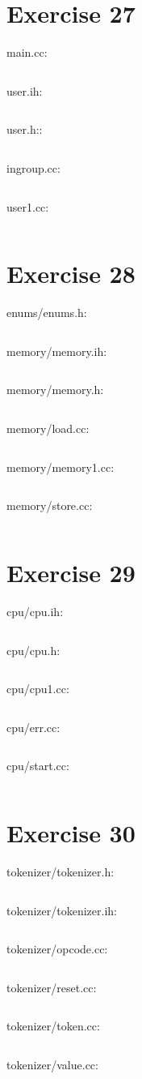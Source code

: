 \documentclass{article}[10pt]
\begin{document}
\section*{Exercise 27}
main.cc:
\inputminted[linenos=true, tabsize=4, frame=lines]{text}{../27/user/main.cc}
user.ih:
\inputminted[linenos=true, tabsize=4, frame=lines]{text}{../27/user/user.ih}
user.h::
\inputminted[linenos=true, tabsize=4, frame=lines]{text}{../27/user/user.h}
ingroup.cc:
\inputminted[linenos=true, tabsize=4, frame=lines]{text}{../27/user/ingroup.cc}
user1.cc:
\inputminted[linenos=true, tabsize=4, frame=lines]{text}{../27/user/user1.cc}

\section*{Exercise 28}
enums/enums.h:
\inputminted[linenos=true, tabsize=4, frame=lines]{text}{../virtualcpu/enums/enums.h}

memory/memory.ih:
\inputminted[linenos=true, tabsize=4, frame=lines]{text}{../virtualcpu/memory/memory.ih}

memory/memory.h:
\inputminted[linenos=true, tabsize=4, frame=lines]{text}{../virtualcpu/memory/memory.h}

memory/load.cc:
\inputminted[linenos=true, tabsize=4, frame=lines]{text}{../virtualcpu/memory/load.cc}

memory/memory1.cc:
\inputminted[linenos=true, tabsize=4, frame=lines]{text}{../virtualcpu/memory/memory1.cc}

memory/store.cc:
\inputminted[linenos=true, tabsize=4, frame=lines]{text}{../virtualcpu/memory/store.cc}

\section*{Exercise 29}
cpu/cpu.ih:
\inputminted[linenos=true, tabsize=4, frame=lines]{text}{../virtualcpu/cpu/cpu.ih}
cpu/cpu.h:
\inputminted[linenos=true, tabsize=4, frame=lines]{text}{../virtualcpu/cpu/cpu.h}
cpu/cpu1.cc:
\inputminted[linenos=true, tabsize=4, frame=lines]{text}{../virtualcpu/cpu/cpu1.cc}
cpu/err.cc:
\inputminted[linenos=true, tabsize=4, frame=lines]{text}{../virtualcpu/cpu/err.cc}
cpu/start.cc:
\inputminted[linenos=true, tabsize=4, frame=lines]{text}{../virtualcpu/cpu/start.cc}
\section*{Exercise 30} 
tokenizer/tokenizer.h:
\inputminted[linenos=true, tabsize=4, frame=lines]{text}{../virtualcpu/tokenizer/tokenizer.h}
tokenizer/tokenizer.ih:
\inputminted[linenos=true, tabsize=4, frame=lines]{text}{../virtualcpu/tokenizer/tokenizer.ih}
tokenizer/opcode.cc:
\inputminted[linenos=true, tabsize=4, frame=lines]{text}{../virtualcpu/tokenizer/opcode.cc}
tokenizer/reset.cc:
\inputminted[linenos=true, tabsize=4, frame=lines]{text}{../virtualcpu/tokenizer/reset.cc}
tokenizer/token.cc:
\inputminted[linenos=true, tabsize=4, frame=lines]{text}{../virtualcpu/tokenizer/token.cc}
tokenizer/value.cc:
\inputminted[linenos=true, tabsize=4, frame=lines]{text}{../virtualcpu/tokenizer/value.cc}
\end{document}
